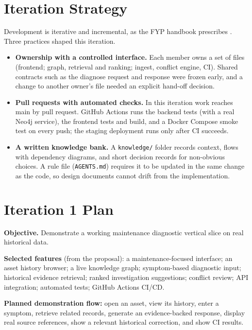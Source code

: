\section{Iteration Strategy}

Development is iterative and incremental, as the FYP handbook prescribes \citep{fast2026}. Three practices shaped this iteration.

\begin{itemize}
\item \textbf{Ownership with a controlled interface.} Each member owns a set of files (frontend; graph, retrieval and ranking; ingest, conflict engine, CI). Shared contracts such as the diagnose request and response were frozen early, and a change to another owner's file needed an explicit hand-off decision.
\item \textbf{Pull requests with automated checks.} In this iteration work reaches main by pull request. GitHub Actions runs the backend tests (with a real Neo4j service), the frontend tests and build, and a Docker Compose smoke test on every push; the staging deployment runs only after CI succeeds.
\item \textbf{A written knowledge bank.} A \texttt{knowledge/} folder records context, flows with dependency diagrams, and short decision records for non-obvious choices. A rule file (\texttt{AGENTS.md}) requires it to be updated in the same change as the code, so design documents cannot drift from the implementation.
\end{itemize}

\section{Iteration 1 Plan}

\textbf{Objective.} Demonstrate a working maintenance diagnostic vertical slice on real historical data.

\textbf{Selected features} (from the proposal): a maintenance-focused interface; an asset history browser; a live knowledge graph; symptom-based diagnostic input; historical evidence retrieval; ranked investigation suggestions; conflict review; API integration; automated tests; GitHub Actions CI/CD.

\textbf{Planned demonstration flow:} open an asset, view its history, enter a symptom, retrieve related records, generate an evidence-backed response, display real source references, show a relevant historical correction, and show CI results.

